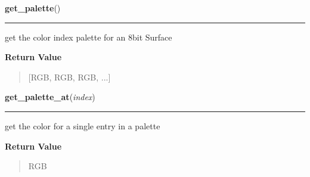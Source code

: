 \hspace{.8\funcindent}\begin{boxedminipage}{\funcwidth}

    \raggedright \textbf{get\_palette}()

    \vspace{-1.5ex}

    \rule{\textwidth}{0.5\fboxrule}
\setlength{\parskip}{2ex}
    get the color index palette for an 8bit Surface

\setlength{\parskip}{1ex}
      \textbf{Return Value}
    \vspace{-1ex}

      \begin{quote}
      [RGB, RGB, RGB, ...]

      \end{quote}

    \end{boxedminipage}

    \label{pygame:Surface:get_palette_at}

    \vspace{0.5ex}

\hspace{.8\funcindent}\begin{boxedminipage}{\funcwidth}

    \raggedright \textbf{get\_palette\_at}(\textit{index})

    \vspace{-1.5ex}

    \rule{\textwidth}{0.5\fboxrule}
\setlength{\parskip}{2ex}
    get the color for a single entry in a palette

\setlength{\parskip}{1ex}
      \textbf{Return Value}
    \vspace{-1ex}

      \begin{quote}
      RGB

      \end{quote}

    \end{boxedminipage}

    \label{pygame:Surface:get_parent}

    \vspace{0.5ex}


